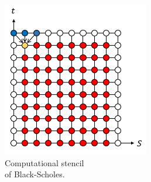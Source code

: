 \documentclass[12pt, oneside]{book}
\theoremstyle{plain}
\theoremstyle{definition}
\begin{document}
\begin{figure}[!htb]
\begin{minipage}[b]{0.5\textwidth}
    \includegraphics[width=\textwidth]{ExplicitBS.png}
    \caption{Computational stencil \\of Black-Scholes.}
  \end{minipage}
\end{figure}
\end{document}

